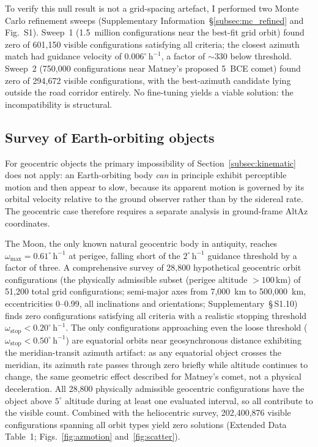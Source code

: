 \documentclass[sn-nature]{sn-jnl}
\begin{document}
To verify this null result is not a grid-spacing artefact, I performed two
Monte Carlo refinement sweeps (Supplementary Information~\S\ref{subsec:mc_refined}
and Fig.~S1). Sweep~1 (1.5~million configurations near the best-fit grid orbit)
found zero of 601,150 visible configurations satisfying all criteria; the
closest azimuth match had guidance velocity of $0.006^\circ\,\mathrm{h}^{-1}$, a
factor of ${\sim}330$ below threshold. Sweep~2 (750,000 configurations near
Matney's proposed 5~BCE comet) found zero of 294,672 visible configurations,
with the best-azimuth candidate lying outside the road corridor entirely. No
fine-tuning yields a viable solution: the incompatibility is structural.

\subsection{Survey of Earth-orbiting objects}\label{subsec:geocentric}

For geocentric objects the primary impossibility of Section~\ref{subsec:kinematic}
does not apply: an Earth-orbiting body \emph{can} in principle exhibit
perceptible motion and then appear to slow, because its apparent motion is
governed by its orbital velocity relative to the ground observer rather than
by the sidereal rate. The geocentric case therefore requires a separate analysis
in ground-frame AltAz coordinates.

The Moon, the only known natural geocentric body in antiquity, reaches
$\omega_\mathrm{max} = 0.61^\circ\,\mathrm{h}^{-1}$ at perigee, falling short
of the $2^\circ\,\mathrm{h}^{-1}$ guidance threshold by a factor of three.
A comprehensive survey of 28,800 hypothetical geocentric orbit configurations
(the physically admissible subset (perigee altitude $>100$\,km) of 51,200 total
grid configurations; semi-major axes from 7,000~km to 500,000~km,
eccentricities 0--0.99, all inclinations and orientations;
Supplementary~\S\,S1.10) finds zero
configurations satisfying all criteria with a realistic stopping threshold
$\omega_\mathrm{stop} < 0.20^\circ\,\mathrm{h}^{-1}$.
The only configurations approaching even the loose threshold
($\omega_\mathrm{stop} < 0.50^\circ\,\mathrm{h}^{-1}$) are equatorial orbits
near geosynchronous distance exhibiting the meridian-transit azimuth artifact:
as any equatorial object crosses the meridian, its azimuth rate passes through
zero briefly while altitude continues to change, the same geometric effect
described for Matney's comet, not a physical deceleration.
All 28,800 physically admissible geocentric configurations have the object
above $5^\circ$ altitude during at least one evaluated interval, so all
contribute to the visible count.
Combined with the heliocentric survey, 202,400,876 visible configurations
spanning all orbit types yield zero solutions (Extended Data Table~1;
Figs.~\ref{fig:azmotion} and~\ref{fig:scatter}).
\end{document}
